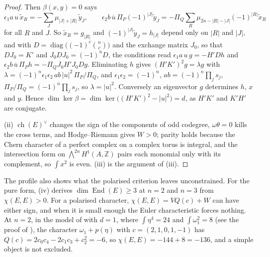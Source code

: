 \documentclass[11pt,reqno]{amsart}
\theoremstyle{plain}
\theoremstyle{definition}
\theoremstyle{remark}
\newcommand{\ZZ}{\mathbb{Z}}
\DeclareMathOperator{\ch}{ch}
\DeclareMathOperator{\End}{End}
\newcommand{\bbar}[1]{\overline{#1}}
\begin{document}
\begin{proof}
Then $\beta(x,y)=0$ says
\[
  \epsilon_{1}a\,u\,\tilde x_{R}=-\sum_{J}\mu_{|J|+|R|}\,\tilde y_{J},
  \qquad
  \epsilon_{2}b\,\bbar u\,\Pi_{P}(-1)^{|J|}\tilde y_{J}
  =-\Pi_{Q}\sum_{R}\mu_{2n-|R|-|J|}(-1)^{|R|}\tilde x_{R}
\]
for all $R$ and $J$. So $\tilde x_{R}=g_{|R|}$ and $(-1)^{|J|}\tilde y_{J}=h_{|J|}$
depend only on $|R|$ and $|J|$, and with $D=\operatorname{diag}\bigl((-1)^{c}
\binom{n}{c}\bigr)$ and the exchange matrix $J_{0}$, so that $DJ_{0}=K'$ and
$J_{0}DJ_{0}=(-1)^{n}D$, the conditions read
$\epsilon_{1}a\,u\,g=-H'Dh$ and $\epsilon_{2}b\,\bbar u\,\Pi_{P}h=-\Pi_{Q}
J_{0}H'J_{0}Dg$. Eliminating $h$ gives $(H'K')^{2}g=\lambda g$ with
$\lambda=(-1)^{n}\epsilon_{1}\epsilon_{2}\,ab\,|u|^{2}\,\Pi_{P}/\Pi_{Q}$, and
$\epsilon_{1}\epsilon_{2}=(-1)^{n}$, $ab=(-1)^{n}\prod_{j}s_{j}$,
$\Pi_{P}/\Pi_{Q}=(-1)^{n}\prod_{j}s_{j}$, so $\lambda=|u|^{2}$. Conversely an
eigenvector $g$ determines $h$, $x$ and $y$. Hence $\dim\ker\beta=
\dim\ker\bigl((H'K')^{2}-|u|^{2}\bigr)=d$, as $H'K'$ and $K'H'$ are
conjugate.

(ii) $\ch(E)^{\vee}$ changes the sign of
the components of odd codegree, $\omega\theta=0$ kills the cross terms, and
Hodge--Riemann gives $W>0$; parity holds because the Chern character of a
perfect complex on a complex torus is integral, and the intersection form on
$\bigwedge^{2n}H^{1}(A,\ZZ)$ pairs each monomial only with its complement, so
$\int x^{2}$ is even. (iii) is the argument of (iii).
\end{proof}

The profile also shows what the polarised criterion leaves unconstrained. For
the pure form, (iv) derives $\dim\End(E)\ge3$ at $n=2$ and
$n=3$ from $\chi(E,E)>0$. For a polarised character, $\chi(E,E)=VQ(c)+W$ can
have either sign, and when it is small enough the Euler characteristic forces
nothing. At $n=2$, in the model of \cite[Setup~4.1]{paperI} with $d=1$, where
$\int\eta^{4}=24$ and $\int\omega_{1}^{2}=8$ (see the proof of
), the character $\omega_{1}+p(\eta)$ with
$c=(2,1,0,1,-1)$ has $Q(c)=2c_{0}c_{4}-2c_{1}c_{3}+c_{2}^{2}=-6$, so
$\chi(E,E)=-144+8=-136$, and a simple object is not excluded.
\end{document}
